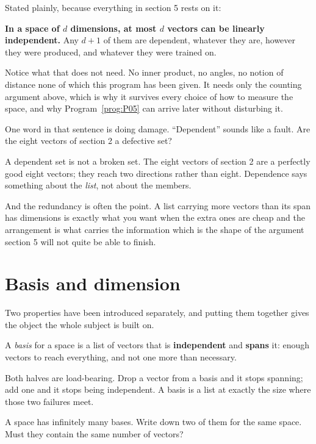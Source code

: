 \begin{fr}

Stated plainly, because everything in section 5 rests on it:

\medskip
\noindent
\textbf{In a space of $d$ dimensions, at most $d$ vectors can be linearly
independent.} Any $d + 1$ of them are dependent, whatever they are, however
they were produced, and whatever they were trained on.

Notice what that does not need. No inner product, no angles, no notion of
distance \dash{} none of which this program has been given. It needs only the
counting argument above, which is why it survives every choice of how to
measure the space, and why Program~\ref{prog:P05} can arrive later without
disturbing it.

One word in that sentence is doing damage. \enquote{Dependent} sounds like a
fault. Are the eight vectors of section 2 a defective set?
\nextframe
\end{fr}

\begin{fr}
A dependent set is not a broken set. The eight vectors of section 2 are a
perfectly good eight vectors; they reach two directions rather than
eight. Dependence says something about the \emph{list}, not about the members.

And the redundancy is often the point. A list carrying more vectors than its
span has dimensions is exactly what you want when the extra ones are cheap and
the arrangement is what carries the information \dash{} which is the shape of
the argument section 5 will not quite be able to finish.
\end{fr}

\section{Basis and dimension}
\label{sec:P04-basis}

\begin{fr}
Two properties have been introduced separately, and putting them together gives
the object the whole subject is built on.

A \emph{basis} for a space is a list of vectors that is \textbf{independent}
and \textbf{spans} it: enough vectors to reach everything, and not one more
than necessary.

Both halves are load-bearing. Drop a vector from a basis and it stops spanning;
add one and it stops being independent. A basis is a list at exactly the size
where those two failures meet.

A space has infinitely many bases. Write down two of them for the same space.
Must they contain the same number of vectors?
\nextframe
\end{fr}

